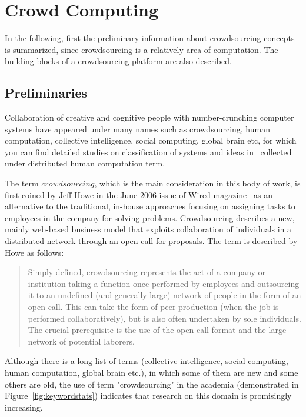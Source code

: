 \chapter{Crowd Computing}
\label{chap:background}

In the following, first the preliminary information about crowdsourcing concepts 
is summarized, since crowdsourcing is a relatively area of computation. The 
building blocks of a crowdsourcing platform are also described.


\section{Preliminaries}
Collaboration of creative and cognitive people with number-crunching 
computer systems have appeared under many names such as crowdsourcing, 
human computation, collective intelligence, social computing, global brain etc, 
for which you can find detailed studies on classification of systems and ideas 
in~\cite{Quinn2009, Quinn2011} collected under distributed human computation term.

The term $crowdsourcing$, which is the main consideration in this body of work, 
is first coined by Jeff Howe in the June 2006 issue of Wired magazine~\cite{Howe2006b} 
as an alternative to the traditional, in-house approaches focusing on assigning tasks 
to employees in the company for solving problems. Crowdsourcing describes a new, 
mainly web-based business model that exploits collaboration of individuals in a 
distributed network through an open call for proposals. The term is described by Howe 
as follows:

\begin{quotation}
Simply defined, crowdsourcing represents the act of a company or institution taking 
a function once performed by employees and outsourcing it to an undefined 
(and generally large) network of people in the form of an open call. This can take 
the form of peer-production (when the job is performed collaboratively), but is also 
often undertaken by sole individuals. The crucial prerequisite is the use of the open 
call format and the large network of potential laborers.~\cite{Howe2006a}
\end{quotation}

Although there is a long list of terms (collective intelligence, social computing, 
human computation, global brain etc.), in which some of them are new and some 
others are old, the use of term "crowdsourcing" in the academia (demonstrated in 
Figure~\ref{fig:keywordstats}) indicates that research on this domain is promisingly 
increasing.

